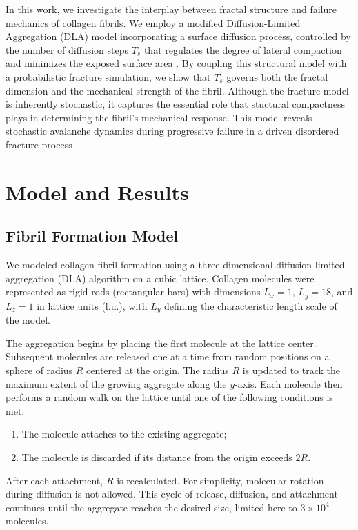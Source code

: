 \documentclass[aps,physrev,preprint,groupedaddress,linenumbers]{revtex4-2}
\newcommand{\rev}[1]{{\color{blue}#1}}
\begin{document}
In this work, we investigate the interplay between fractal structure and failure mechanics of collagen fibrils. We employ a modified Diffusion-Limited Aggregation (DLA) model incorporating a surface diffusion process, controlled by the number of diffusion steps $T_s$ that regulates the degree of lateral compaction and minimizes the exposed surface area \cite{Parkinson1995}. By coupling this structural model with a probabilistic fracture simulation, we show that $T_s$ governs both the fractal dimension and the mechanical strength of the fibril. Although the fracture model is inherently stochastic, it captures the essential role that stuctural compactness plays in determining the fibril's mechanical response. \rev{This model reveals stochastic avalanche dynamics during progressive failure in a driven disordered fracture process \cite{Zapperi1997a,Zapperi1999}.}

\section{Model and Results}
\subsection{Fibril Formation Model}

We modeled collagen fibril formation using a three-dimensional diffusion-limited aggregation (DLA) algorithm on a cubic lattice. Collagen molecules were represented as rigid rods (rectangular bars) with dimensions $L_x = 1$, $L_y = 18$, and $L_z = 1$ in lattice units (l.u.), with $L_y$ defining the characteristic length scale of the model.

The aggregation begins by placing the first molecule at the lattice center. Subsequent molecules are released one at a time from random positions on a sphere of radius $R$ centered at the origin. The radius $R$ is updated to track the maximum extent of the growing aggregate along the $y$-axis. Each molecule then performs a random walk on the lattice until one of the following conditions is met:

\begin{enumerate}
	\item The molecule attaches to the existing aggregate;
	\item The molecule is discarded if its distance from the origin exceeds $2R$.
\end{enumerate}

After each attachment, $R$ is recalculated. For simplicity, molecular rotation during diffusion is not allowed. This cycle of release, diffusion, and attachment continues until the aggregate reaches the desired size, limited here to $3\times 10^4$ molecules.
\end{document}

